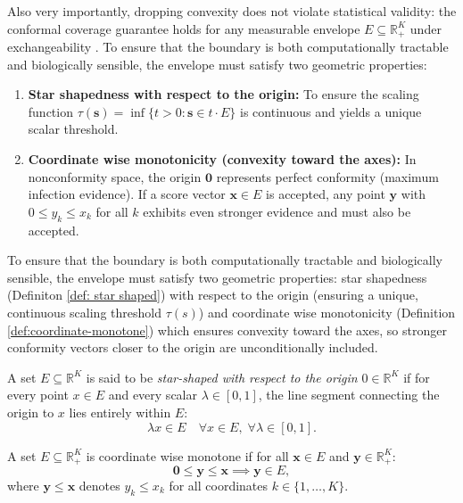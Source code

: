 Also very importantly, dropping convexity does not violate statistical validity: the conformal coverage guarantee holds for 
any measurable envelope $E \subseteq \mathbb{R}_+^K$ under exchangeability \cite{ochoarivera2024conformal}. To ensure that 
the boundary is both computationally tractable and biologically sensible, the envelope must satisfy two geometric properties:
\begin{enumerate}
    \item \textbf{Star shapedness with respect to the origin:} To ensure the scaling function $\tau(\mathbf{s}) = \inf\{t > 0 
           : \mathbf{s} \in t \cdot E\}$ is continuous and yields a unique scalar threshold.
    \item \textbf{Coordinate wise monotonicity (convexity toward the axes):} In nonconformity space, the origin $\mathbf{0}$ 
           represents perfect conformity (maximum infection evidence). If a score vector $\mathbf{x} \in E$ is accepted, any 
           point $\mathbf{y}$ with $0 \le y_k \le x_k$ for all $k$ exhibits even stronger evidence and must also be accepted.
\end{enumerate}

To ensure that the boundary is both computationally tractable and biologically sensible, the envelope must satisfy two 
geometric properties: star shapedness (Definiton \ref{def: star shaped}) with respect to the origin (ensuring a unique, 
continuous scaling threshold $\tau(s)$) and coordinate wise monotonicity (Definition \ref{def:coordinate-monotone}) which 
ensures convexity toward the axes, so stronger conformity vectors closer to the origin are 
unconditionally included.

\begin{definition}
\label{def: star shaped}
A set $E \subseteq \mathbb{R}^K$ is said to be \emph{star-shaped with respect to the origin} $0 \in \mathbb{R}^K$ if for 
every point $x \in E$ and every scalar $\lambda \in [0, 1]$, the line segment connecting the origin to $x$ lies entirely 
within $E$:
$$\lambda x \in E \quad \forall x \in E, \; \forall \lambda \in [0, 1].$$
\end{definition}


\begin{definition}
\label{def:coordinate-monotone}
A set $E \subseteq \mathbb{R}_+^K$ is coordinate wise monotone if for all $\mathbf{x} \in E$ and $\mathbf{y} \in 
\mathbb{R}_+^K$:
\begin{equation*}
\mathbf{0} \le \mathbf{y} \le \mathbf{x} \implies \mathbf{y} \in E,
\end{equation*}
where $\mathbf{y} \le \mathbf{x}$ denotes $y_k \le x_k$ for all coordinates $k \in \{1, \dots, K\}$.
\end{definition}

